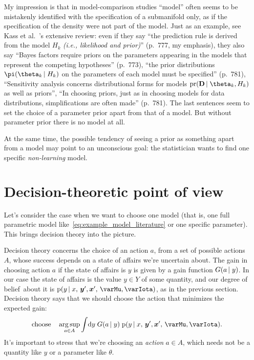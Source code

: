 \documentclass[\ifafour a4paper,12pt,\else a5paper,10pt,\fi%
onecolumn,oneside,article,%
british%
]{memoir}
\theoremstyle{remark}
\theoremstyle{innote}
\newcommand*{\citep}{\parencites}
\newcommand*{\citey}{\parencites*}
\newcommand*{\di}{\mathrm{d}}%
\newcommand*{\pf}{\mathrm{p}}%
\renewcommand*{\|}{\nonscript\,\vert\nonscript\;\mathopen{}}
\newcommand*{\chaps}{chs}%
\newcommand*{\etal}{{et al.}}
\DeclareMathOperator*{\argsup}{arg\,sup}
\newcommand*{\dob}{degree of belief}
\newcommand*{\yM}{\varMu}
\newcommand*{\yA}{A}
\newcommand*{\yY}{Y}
\newcommand*{\yx}{\bm{x}}
\newcommand*{\yy}{\bm{y}}
\newcommand*{\yI}{\varIota}
\newcommand*{\yg}{G}
\begin{document}
My impression is that in model-comparison studies \enquote{model} often
seems to be mistakenly identified with the specification of a submanifold
only, as if the specification of the density were not part of the model.
Just as an example, see Kass \etal\ \citey{kassetal1995}'s extensive
review: even if they say \enquote{the prediction rule is derived from the
  model $H_k$ \emph{(i.e., likelihood and prior)}} (p.~777, my emphasis),
they also say \enquote{Bayes factors require priors on the parameters
  appearing in the models that represent the competing hypotheses}
(p.~773), \enquote{the prior distributions $\pi(\theta_k \| H_k)$ on the
  parameters of each model must be specified} (p.~781),
\enquote{Sensitivity analysis concerns distributional forms for models
  $\mathrm{pr}(\mathbf{D} \| \theta_k, H_k)$ as well as priors},
\enquote{In choosing priors, just as in choosing models for data
  distributions, simplifications are often made} (p.~781). The last
sentences seem to set the choice of a parameter prior apart from that of a
model. But without parameter prior there is no model at all.

At the same time, the possible tendency of seeing a prior as something apart
from a model may point to an unconscious goal: the statistician wants to
find one specific \emph{non-learning} model.

\section{Decision-theoretic point of view}
\label{sec:decision_theory_view}

Let's consider the case when we want to choose one model (that is, one full
parametric model like~\eqref{eq:example_model_literature} or one specific
parameter). This brings decision theory
\citep{raiffaetal1961_r2000,berger1980_r1985}[\chaps~13--14]{jaynes1994_r2003}
into the picture.

Decision theory concerns the choice of an action $a$, from a set of
possible actions $\yA$, whose success depends on a state of affairs we're
uncertain about. The gain in choosing action $a$ if the state of affairs is
$y$ is given by a gain function $\yg(a \| y)$. In our case the state of
affairs is the value $y \in \yY$ of some quantity, and our \dob\ about it
is $\pf(y \| x,\, \yy',\yx',\, \yM, \yI)$, as in the previous section.
Decision theory says that we should choose the action that minimizes the
expected gain:
\begin{equation}
  \label{eq:decision_theory_choice}
  \text{choose} \quad
  \argsup_{a \in \yA}
  \int\!\di y\; \yg(a \| y)\; \pf(y \| x,\, \yy',\yx',\, \yM, \yI).
\end{equation}
It's important to stress that we're choosing an \emph{action} $a \in \yA$,
which needs not be a quantity like $y$ or a parameter like $\theta$.
\end{document}
